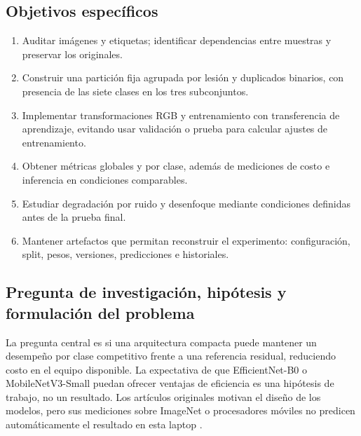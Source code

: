 \subsection{Objetivos específicos}
\begin{enumerate}[leftmargin=1.6em,itemsep=3pt]
\item Auditar imágenes y etiquetas; identificar dependencias entre muestras y preservar los originales.
\item Construir una partición fija agrupada por lesión y duplicados binarios, con presencia de las siete clases en los tres subconjuntos.
\item Implementar transformaciones RGB y entrenamiento con transferencia de aprendizaje, evitando usar validación o prueba para calcular ajustes de entrenamiento.
\item Obtener métricas globales y por clase, además de mediciones de costo e inferencia en condiciones comparables.
\item Estudiar degradación por ruido y desenfoque mediante condiciones definidas antes de la prueba final.
\item Mantener artefactos que permitan reconstruir el experimento: configuración, split, pesos, versiones, predicciones e historiales.
\end{enumerate}

\subsection{Pregunta de investigación, hipótesis y formulación del problema}
La pregunta central es si una arquitectura compacta puede mantener un desempeño por clase competitivo frente a una referencia residual, reduciendo costo en el equipo disponible. La expectativa de que EfficientNet-B0 o MobileNetV3-Small puedan ofrecer ventajas de eficiencia es una hipótesis de trabajo, no un resultado. Los artículos originales motivan el diseño de los modelos, pero sus mediciones sobre ImageNet o procesadores móviles no predicen automáticamente el resultado en esta laptop \cite{he2016,tan2019,howard2019}.

